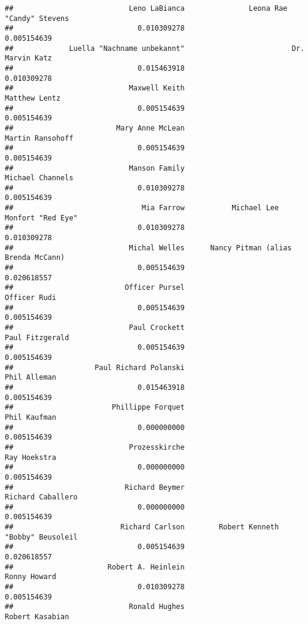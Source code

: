 \documentclass[
]{article}
\begin{document}
\begin{verbatim}
##                           Leno LaBianca               Leona Rae "Candy" Stevens 
##                             0.010309278                             0.005154639 
##             Luella "Nachname unbekannt"                         Dr. Marvin Katz 
##                             0.015463918                             0.010309278 
##                           Maxwell Keith                           Matthew Lentz 
##                             0.005154639                             0.005154639 
##                        Mary Anne McLean                        Martin Ransohoff 
##                             0.005154639                             0.005154639 
##                           Manson Family                        Michael Channels 
##                             0.010309278                             0.005154639 
##                              Mia Farrow           Michael Lee Monfort "Red Eye" 
##                             0.010309278                             0.010309278 
##                           Michal Welles      Nancy Pitman (alias Brenda McCann) 
##                             0.005154639                             0.020618557 
##                          Officer Pursel                            Officer Rudi 
##                             0.005154639                             0.005154639 
##                           Paul Crockett                         Paul Fitzgerald 
##                             0.005154639                             0.005154639 
##                   Paul Richard Polanski                            Phil Alleman 
##                             0.015463918                             0.005154639 
##                       Phillippe Forquet                            Phil Kaufman 
##                             0.000000000                             0.005154639 
##                           Prozesskirche                            Ray Hoekstra 
##                             0.000000000                             0.005154639 
##                          Richard Beymer                       Richard Caballero 
##                             0.000000000                             0.005154639 
##                         Richard Carlson        Robert Kenneth "Bobby" Beusoleil 
##                             0.005154639                             0.020618557 
##                      Robert A. Heinlein                            Ronny Howard 
##                             0.010309278                             0.005154639 
##                           Ronald Hughes                         Robert Kasabian 

\end{verbatim}
\end{document}

